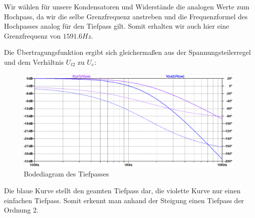 Wir wählen für unsere Kondensatoren und Widerstände die analogen Werte zum Hochpass, da wir die selbe Grenzfrequenz anstreben und die Frequenzformel des Hochpasses analog für den Tiefpass gilt. Somit erhalten wir auch hier eine Grenzfrequenz von $1591.6Hz$.

\newpage
Die Übertragungsfunktion ergibt sich gleichermaßen aus der Spannungsteilerregel und dem Verhältnis $U_{t2}$ zu $U_{e}$:

\newpage
\begin{figure}[htb]
    \includegraphics[width=16cm]{./pictures/Tiefpass_Bode}
    \caption{Bodediagram des Tiefpasses}
    \label{fig:TiefpassBode}
\end{figure}

Die blaue Kurve stellt den geamten Tiefpass dar, die violette Kurve nur einen einfachen Tiefpass. Somit erkennt man anhand der Steigung einen Tiefpass der Ordnung 2.

